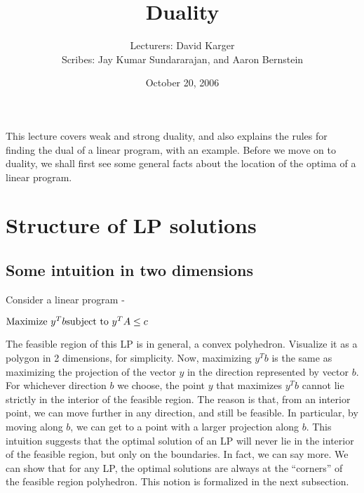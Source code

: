 \documentclass[11pt]{article}
\title{Duality}
\date{October 20, 2006}
\author{Lecturers: David Karger\\ Scribes: Jay Kumar Sundararajan, and Aaron Bernstein}
\begin{document}
%
%
%
%

%



This lecture covers weak and strong duality, and also explains the rules for finding the dual of a linear program, with an example. Before we move on to duality, we shall first see some general facts about the location of the optima of a linear program.

\section{Structure of LP solutions}

\subsection{Some intuition in two dimensions}

Consider a linear program - 

$\mbox{Maximize } y^Tb\\ \mbox{subject to } y^TA\leq c$

The feasible region of this LP is in general, a convex polyhedron. Visualize it as a polygon in 2 dimensions, for simplicity. Now, maximizing $y^Tb$ is the same as maximizing the projection of the vector $y$ in the direction represented by vector $b$. For whichever direction $b$ we choose, the point $y$ that maximizes $y^Tb$ cannot lie strictly in the interior of the feasible region. The reason is that, from an interior point, we can move further in any direction, and still be feasible. In particular, by moving along $b$, we can get to a point with a larger projection along $b$. This intuition suggests that the optimal solution of an LP will never lie in the interior of the feasible region, but only on the boundaries. In fact, we can say more. We can show that for any LP, the optimal solutions are always at the ``corners'' of the feasible region polyhedron. This notion is formalized in the next subsection.
\end{document}
